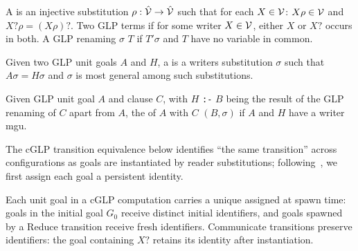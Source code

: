 \begin{definition}
\label{def:glp-renaming}
A  is an injective substitution $\rho: \hat{\mathcal{V}} \to \hat{\mathcal{V}}$ such that for each $X \in \mathcal{V}$: $X\rho \in \mathcal{V}$ and $X?\rho = (X\rho)?$. Two GLP terms  if for some writer $X \in \mathcal{V}$, either $X$ or $X?$ occurs in both. A GLP renaming $\sigma$  $T$ if $T'\sigma$ and $T$ have no variable in common.
\end{definition}

\begin{definition}
\label{def:writer-mgu}
Given two GLP unit goals $A$ and $H$, a  is a writers substitution $\sigma$ such that $A\sigma = H\sigma$ and $\sigma$ is most general among such substitutions. 
\end{definition}

\begin{definition}
\label{def:glp-reduction}
Given GLP unit goal $A$ and clause $C$, with $H$ \verb|:-| $B$ being the result of the GLP renaming of $C$ apart from $A$, the  of $A$ with $C$  $(B,\sigma)$ if $A$ and $H$ have a writer mgu.
\end{definition}

The cGLP transition equivalence below identifies ``the same transition'' across configurations as goals are instantiated by reader substitutions; following~\cite{lewis2026volitional}, we first assign each goal a persistent identity.

\begin{definition}
\label{def:goal-identity}
Each unit goal in a cGLP computation carries a unique  assigned at spawn time: goals in the initial goal $G_0$ receive distinct initial identifiers, and goals spawned by a Reduce transition receive fresh identifiers. Communicate transitions preserve identifiers: the goal containing $X?$ retains its identity after instantiation.
\end{definition}

